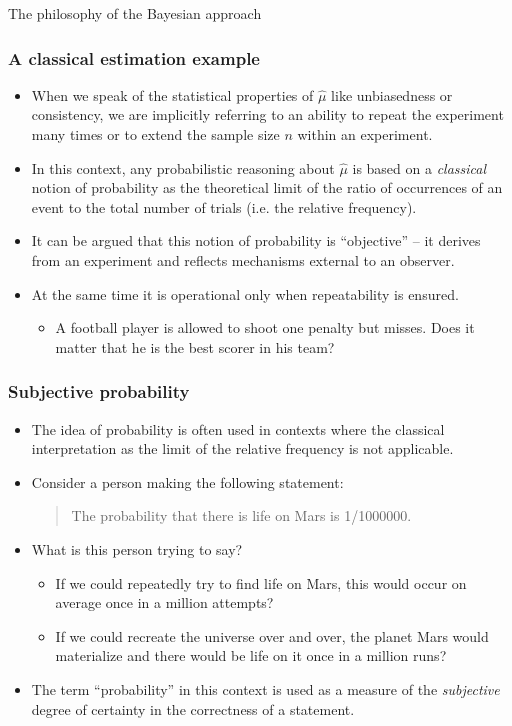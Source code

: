 \documentclass[10pt]{beamer}
\theoremstyle{definition}
\begin{document}
\begin{section}{The philosophy of the Bayesian approach}
\begin{frame}
\frametitle{A classical estimation example}
\begin{itemize}\itemsep1em
\item When we speak of the statistical properties of $\hat{\mu}$ like unbiasedness or consistency, we are implicitly referring to an ability to repeat the experiment many times or to extend the sample size $ n $ within an experiment.
\item In this context, any probabilistic reasoning about $\hat{\mu}$ is based on a \emph{classical} notion of probability as the theoretical limit of the ratio of occurrences of an event to the total number of trials (i.e. the relative frequency).
\item It can be argued that this notion of probability is ``objective'' -- it derives from an experiment and reflects mechanisms external to an observer.
\item At the same time it is operational only when repeatability is ensured.
	\begin{itemize}\itemsep1em
	\item A football player is allowed to shoot one penalty but misses. Does it matter that he is the best scorer in his team?
	\end{itemize}
\end{itemize}
\end{frame}

\begin{frame}
\frametitle{Subjective probability}
\begin{itemize}\itemsep1em
\item The idea of probability is often used in contexts where the classical interpretation as the limit of the relative frequency is not applicable.
\item Consider a person making the following statement: 
\begin{quote}
The probability that there is life on Mars is 1/1000000.
\end{quote}
\item What is this person trying to say?
	\begin{itemize}\itemsep1em
	\item If we could repeatedly try to find life on Mars, this would occur on average once in a million attempts?
	\item If we could recreate the universe over and over, the planet Mars would materialize and there would be life on it once in a million runs?
	\end{itemize}
\item \alert{The term ``probability'' in this context is used as a measure of the \emph{subjective} degree of certainty in the correctness of a statement.}
\end{itemize}
\end{frame}


\end{section}
\end{document}
